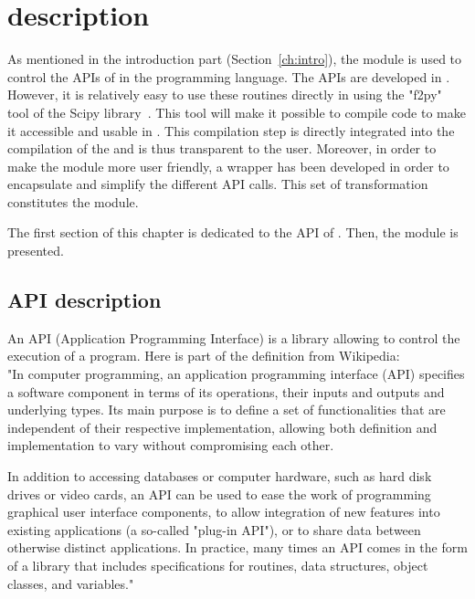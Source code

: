 \chapter{\TelApy{} description}\label{ch:TelApy_description}

As mentioned in the introduction part (Section~\ref{ch:intro}), the \TelApy{}
module is used to control the APIs of \telemacsystem{} in the \python{} programming
language. The \telemacsystem{} APIs are developed in \fortran{}. However, it is
relatively easy to use these \fortran{} routines directly in \python{} using the
"f2py" tool of the \python{} Scipy library~\cite{Peterson2009}. This tool will
make it possible to compile \fortran{} code to make it accessible and usable in
\python{}. This compilation step is directly integrated into the compilation of
the \telemacsystem{} and is thus transparent to the user. Moreover, in order to
make the \TelApy{} module more user friendly, a \python{} wrapper has been developed
in order to encapsulate and simplify the different API \python{} calls. This set
of transformation constitutes the \TelApy{} module.

The first section of this chapter is dedicated to the \fortran{} API of
\telemacsystem{}. Then, the \python{} \TelApy{} module is presented.

\section{\telemacsystem{} \fortran{} API description}
%
An API (Application Programming Interface) is a library allowing to control the
execution of a program. Here is part of the definition from Wikipedia:\\

"In computer programming, an application programming interface (API) specifies
a software component in terms of its operations, their inputs and outputs and
underlying types. Its main purpose is to define a set of functionalities that
are independent of their respective implementation, allowing both definition
and implementation to vary without compromising each other.

In addition to accessing databases or computer hardware, such as hard disk
drives or video cards, an API can be used to ease the work of programming
graphical user interface components, to allow integration of new features into
existing applications (a so-called "plug-in API"), or to share data between
otherwise distinct applications. In practice, many times an API comes in the
form of a library that includes specifications for routines, data structures,
object classes, and variables." \\

